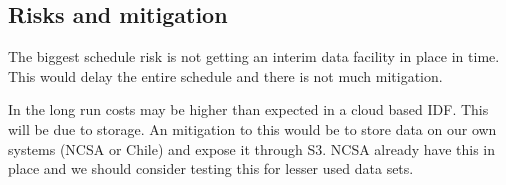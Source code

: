 \subsection{Risks and mitigation}

The biggest schedule risk is not getting an interim data facility in place in time.
This would delay the entire schedule and there is not much mitigation.

In the long run costs may be higher than expected in a cloud based IDF. This will be due to storage.
An mitigation to this would be to store data on our own systems (NCSA or Chile) and expose it through S3.
NCSA already have this in place and we should consider testing this for lesser used data sets.

